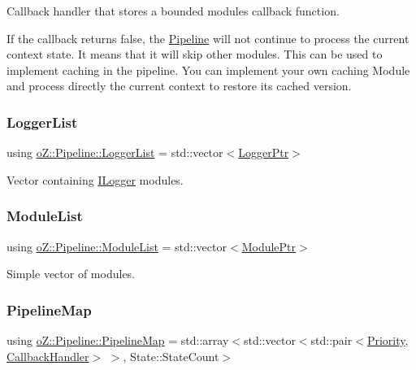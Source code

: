 Callback handler that stores a bounded module\textquotesingle{}s callback function. 

If the callback returns false, the \mbox{\hyperlink{classo_z_1_1_pipeline}{Pipeline}} will not continue to process the current context state. It means that it will skip other modules. This can be used to implement caching in the pipeline. You can implement your own caching Module and process directly the current context to restore its cached version. \mbox{\label{classo_z_1_1_pipeline_aa1f26badb603f054e554e3ddf8b846b0}} 
\subsubsection{\texorpdfstring{LoggerList}{LoggerList}}
{\footnotesize\ttfamily using \mbox{\hyperlink{classo_z_1_1_pipeline_aa1f26badb603f054e554e3ddf8b846b0}{o\+Z\+::\+Pipeline\+::\+Logger\+List}} =  std\+::vector$<$\mbox{\hyperlink{namespaceo_z_aaa2fbabbfafc6616a7e69651b62a3d4e}{Logger\+Ptr}}$>$}



Vector containing \mbox{\hyperlink{classo_z_1_1_i_logger}{I\+Logger}} modules. 

\mbox{\label{classo_z_1_1_pipeline_a3bb478d291a83763b269d8d27e186a47}} 
\subsubsection{\texorpdfstring{ModuleList}{ModuleList}}
{\footnotesize\ttfamily using \mbox{\hyperlink{classo_z_1_1_pipeline_a3bb478d291a83763b269d8d27e186a47}{o\+Z\+::\+Pipeline\+::\+Module\+List}} =  std\+::vector$<$\mbox{\hyperlink{namespaceo_z_af5a56aaaee027504979038f38991adcf}{Module\+Ptr}}$>$}



Simple vector of modules. 

\mbox{\label{classo_z_1_1_pipeline_ae4082276a9a2bafefab47a1298feec67}} 
\subsubsection{\texorpdfstring{PipelineMap}{PipelineMap}}
{\footnotesize\ttfamily using \mbox{\hyperlink{classo_z_1_1_pipeline_ae4082276a9a2bafefab47a1298feec67}{o\+Z\+::\+Pipeline\+::\+Pipeline\+Map}} =  std\+::array$<$std\+::vector$<$std\+::pair$<$\mbox{\hyperlink{namespaceo_z_af05a92eb185d18369e9b4acdcd9dcd12}{Priority}}, \mbox{\hyperlink{classo_z_1_1_pipeline_a5a71ea2f2d4be5b82589c1b8175722f4}{Callback\+Handler}}$>$ $>$, State\+::\+State\+Count$>$}



